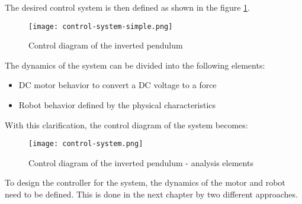 The desired control system is then defined as shown in the figure \ref{fig:condiag}.

\begin{figure}[h]
	\centering
	\texttt{[image: control-system-simple.png]}
	\caption{Control diagram of the inverted pendulum}\label{fig:condiag}
\end{figure}

The dynamics of the system can be divided into the following elements:
\begin{itemize}
	\item DC motor behavior to convert a DC voltage to a force
	\item Robot behavior defined by the physical characteristics
\end{itemize}

With this clarification, the control diagram of the system becomes:

\begin{figure}[h]
	\centering
	\texttt{[image: control-system.png]}
	\caption{Control diagram of the inverted pendulum - analysis elements}\label{fig:condiag2}
\end{figure}

To design the controller for the system, the dynamics of the motor and robot need to be defined. This is done in the next chapter by two different approaches.
